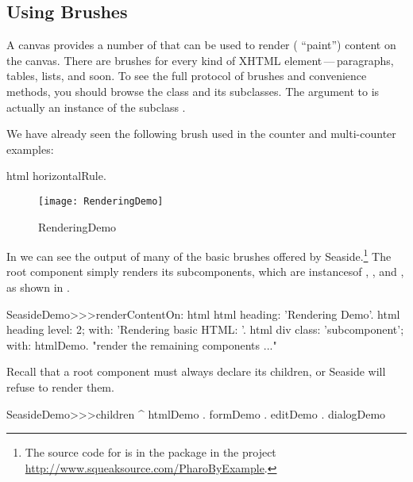 \documentclass[a4paper,10pt,twoside]{book}
\begin{document}
\subsection{Using Brushes}

A canvas provides a number of  that can be used to render (\ie
``paint'') content on the canvas.
There are brushes for every kind of XHTML element\,---\,paragraphs, tables, lists, and soon.
To see the full protocol of brushes and convenience methods, you should browse the class
 and its subclasses.
The argument to  is actually an instance of the subclass
.

We have already seen the following brush used in the counter and multi-counter examples:
\begin{code}{}
html horizontalRule.
\end{code}

\begin{figure}[ht]
\begin{center}
\texttt{[image: RenderingDemo]}
\caption{RenderingDemo}
\end{center}
\end{figure}

In  we can see the output of many of the basic brushes offered by
Seaside.\footnote{The source code for  is in the package
 in the project \url{http://www.squeaksource.com/PharoByExample}.}
The root component  simply renders its subcomponents, which are instancesof , ,  and
, as shown in .

\needspace{7ex}
\begin{method}[renderdemo]{}
SeasideDemo>>>renderContentOn: html
	html heading: 'Rendering Demo'.
	html heading
		level: 2;
		with: 'Rendering basic HTML: '.
	html div
		class: 'subcomponent';
		with: htmlDemo.
	"render the remaining components ..."
\end{method}

\noindent
Recall that a root component must always declare its children, or Seaside will refuse to
render them.
\begin{code}{}
SeasideDemo>>>children
	^ { htmlDemo . formDemo . editDemo . dialogDemo }
\end{code}
\end{document}
